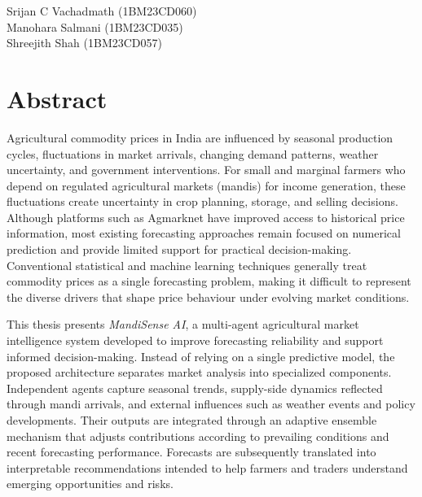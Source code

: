 \documentclass[12pt,a4paper]{report}
\theoremstyle{definition}
\theoremstyle{remark}
\begin{document}
\vspace{1.8cm}
\begin{flushright}
Srijan C Vachadmath (1BM23CD060)\\
Manohara Salmani (1BM23CD035)\\
Shreejith Shah (1BM23CD057)\\
\end{flushright}

\newpage

\tableofcontents

\clearpage

\listoftables

\clearpage

\listoffigures

\clearpage

\setcounter{page}{1}

\newpage
\chapter*{\centering Abstract}


Agricultural commodity prices in India are influenced by seasonal production cycles, fluctuations in market arrivals, changing demand patterns, weather uncertainty, and government interventions. For small and marginal farmers who depend on regulated agricultural markets (mandis) for income generation, these fluctuations create uncertainty in crop planning, storage, and selling decisions. Although platforms such as Agmarknet have improved access to historical price information, most existing forecasting approaches remain focused on numerical prediction and provide limited support for practical decision-making. Conventional statistical and machine learning techniques generally treat commodity prices as a single forecasting problem, making it difficult to represent the diverse drivers that shape price behaviour under evolving market conditions.

This thesis presents \textit{MandiSense AI}, a multi-agent agricultural market intelligence system developed to improve forecasting reliability and support informed decision-making. Instead of relying on a single predictive model, the proposed architecture separates market analysis into specialized components. Independent agents capture seasonal trends, supply-side dynamics reflected through mandi arrivals, and external influences such as weather events and policy developments. Their outputs are integrated through an adaptive ensemble mechanism that adjusts contributions according to prevailing conditions and recent forecasting performance. Forecasts are subsequently translated into interpretable recommendations intended to help farmers and traders understand emerging opportunities and risks.
\end{document}
